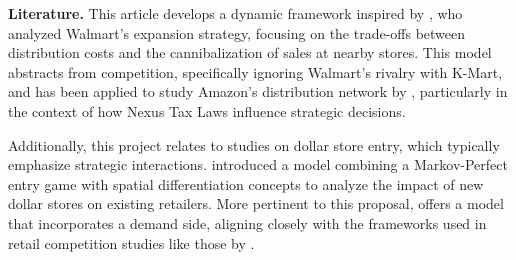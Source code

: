 \documentclass[11pt]{article}
\begin{document}
\textbf{Literature.}  This article develops a dynamic framework inspired by \citeauthor{holmes2011diffusion} \citeyear{holmes2011diffusion}, who analyzed Walmart's expansion strategy, focusing on the trade-offs between distribution costs and the cannibalization of sales at nearby stores. This model abstracts from competition, specifically ignoring Walmart's rivalry with K-Mart, and has been applied to study Amazon's distribution network by \citeauthor{houde2023nexus} \citeyear{houde2023nexus}, particularly in the context of how Nexus Tax Laws influence strategic decisions.

Additionally, this project relates to studies on dollar store entry, which typically emphasize  strategic interactions. \citeauthor{caoui2022impact} \citeyear{caoui2022impact} introduced a model combining a Markov-Perfect entry game with spatial differentiation concepts to analyze the impact of new dollar stores on existing retailers. More pertinent to this proposal,  \citeauthor{chenarides2024dynamic} \citeyear{chenarides2024dynamic} offers a model that incorporates a demand side, aligning closely with the frameworks used in retail competition studies like those by \citeauthor{ellickson2020measuring} \citeyear{ellickson2020measuring}.





\end{document}
